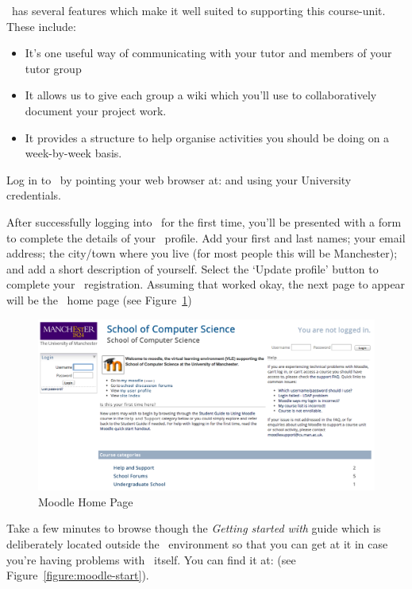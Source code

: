 \moodle\ has several features which make it well suited to supporting this course-unit. These include:
\begin{itemize}
\item It's one useful way of communicating with your tutor and members of your tutor group 
\item It allows us to give each group a wiki which you'll use to collaboratively document your project work.
\item It provides a structure to help organise activities you should be doing on a week-by-week basis.
\end{itemize}

Log in to \moodle\ by pointing your web browser at:  and using your University credentials. 

After successfully logging into \moodle\ for the first time, you'll be presented with a form to complete the details of your \moodle\ profile. Add your first and last names; your email address; the city/town where you live (for most people this will be Manchester); and add a short description of yourself. Select the `Update profile' button to complete your \moodle\ registration. Assuming that worked okay, the next page to appear will be the \moodle\ home page (see  Figure~\ref{figure:moodle-home})

\begin{figure}
\centerline{\includegraphics[width=15cm]{images/moodle-home}}
\caption{Moodle Home Page}\label{figure:moodle-home}
\end{figure}

Take a few minutes to browse though the \emph{Getting started with \Moodle} guide which is deliberately located outside the \moodle\ environment so that you can get at it in case you're having problems with \moodle\ itself. You can find it at:  (see Figure~\ref{figure:moodle-start}).

